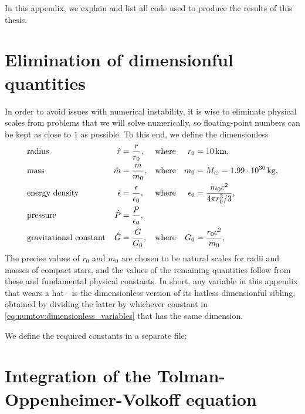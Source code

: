 In this appendix, we explain and list all code used to produce the results of this thesis.

\section{Elimination of dimensionful quantities}

In order to avoid issues with numerical instability, it is wise to eliminate physical scales from problems that we will solve numerically, so floating-point numbers can be kept as close to $1$ as possible.
To this end, we define the dimensionless
\begin{subequations}
\begin{align}
	& \text{radius}                 & \hat{r}        &= \frac{r}{r_0}               , & \text{where} && r_0        &= \SI{10}{\kilo\meter} , \\
	& \text{mass}                   & \hat{m}        &= \frac{m}{m_0}               , & \text{where} && m_0        &= M_\odot = \SI{1.99e30}{\kilogram} , \\
	& \text{energy density}         & \hat{\epsilon} &= \frac{\epsilon}{\epsilon_0} , & \text{where} && \epsilon_0 &= \frac{m_0 c^2}{4 \pi r_0^3 / 3} , \\
	& \text{pressure}               &  \hat{P}       &= \frac{P}{\epsilon_0}        , \\
	& \text{gravitational constant} & \hat{G}        &= \frac{G}{G_0}               , & \text{where} && G_0 &= \frac{r_0 c^2}{m_0} , \\
\end{align}%
\label{eq:numtov:dimensionless_variables}%
\end{subequations}%
The precise values of $r_0$ and $m_0$ are chosen to be natural scales for radii and masses of compact stars, and the values of the remaining quantities follow from these and fundamental physical constants.
In short, any variable in this appendix that wears a hat $\, \hat{} \, $ is the dimensionless version of its hatless dimensionful sibling, obtained by dividing the latter by whichever constant in \cref{eq:numtov:dimensionless_variables} that has the same dimension.

We define the required constants in a separate file:


\section{Integration of the Tolman-Oppenheimer-Volkoff equation}
\label{sec:nstars:numtov}

